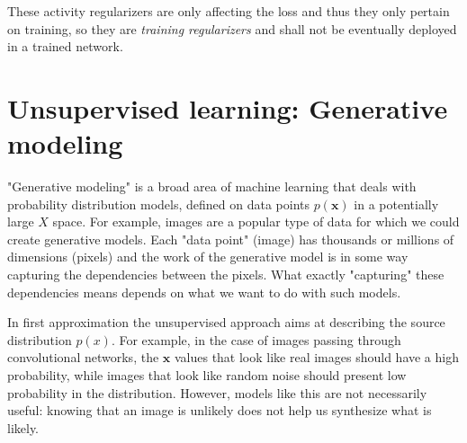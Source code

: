 These activity regularizers are only affecting the loss and thus they only pertain on training, so they are \textit{training regularizers} and shall not be eventually deployed in a trained network.




\section{Unsupervised learning: Generative modeling}
%
"Generative modeling" is a broad area of machine learning that deals with probability distribution models, defined on data points $p(\bm{x})$ in a potentially large $X$ space. For example, images are a popular type of data for which we could create generative models. Each "data point" (image) has thousands or millions of dimensions (pixels) and the work of the generative model is in some way capturing the dependencies between the pixels. What exactly "capturing" these dependencies means depends on what we want to do with such models.

In first approximation the unsupervised approach aims at describing the source distribution $p(x)$.
For example, in the case of images passing through convolutional networks, the $\bm{x}$ values that look like real images should have a high probability, while images that look like random noise should present low probability in the distribution. However, models like this are not necessarily useful: knowing that an image is unlikely does not help us synthesize what is likely. 

